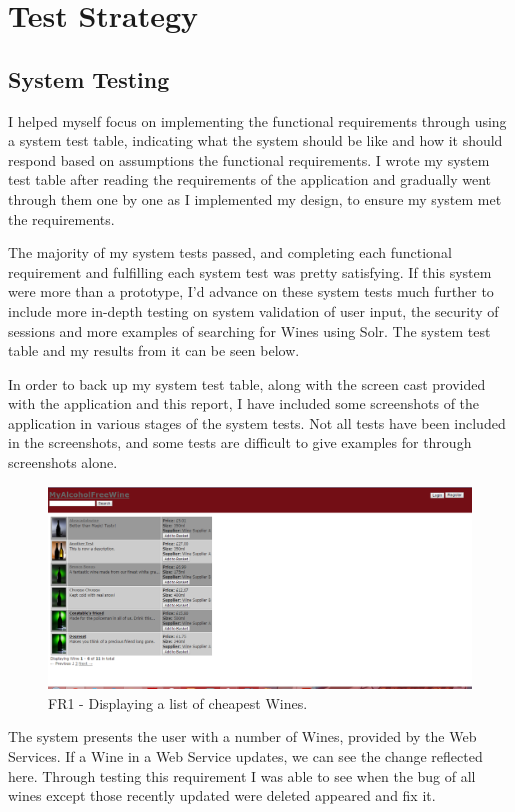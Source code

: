 \documentclass[12pt]{article}
\begin{document}
\section{Test Strategy}
\subsection{System Testing}
I helped myself focus on implementing the functional requirements through using a system test table, indicating what the system should be like and how it should respond based on assumptions the functional requirements. I wrote my system test table after reading the requirements of the application and gradually went through them one by one as I implemented my design, to ensure my system met the requirements.

The majority of my system tests passed, and completing each functional requirement and fulfilling each system test was pretty satisfying. If this system were more than a prototype, I'd advance on these system tests much further to include more in-depth testing on system validation of user input, the security of sessions and more examples of searching for Wines using Solr. The system test table and my results from it can be seen below.



In order to back up my system test table, along with the screen cast provided with the application and this report, I have included some screenshots of the application in various stages of the system tests. Not all tests have been included in the screenshots, and some tests are difficult to give examples for through screenshots alone.

\begin{figure}[H]
        \centering
                \includegraphics[width=1\textwidth]{assets/FR1_screen_1}
                \caption{FR1 - Displaying a list of cheapest Wines.}
                \label{fig: FR1_1.} 
\end{figure}
The system presents the user with a number of Wines, provided by the Web Services. If a Wine in a Web Service updates, we can see the change reflected here. Through testing this requirement I was able to see when the bug of all wines except those recently updated were deleted appeared and fix it.
\end{document}
